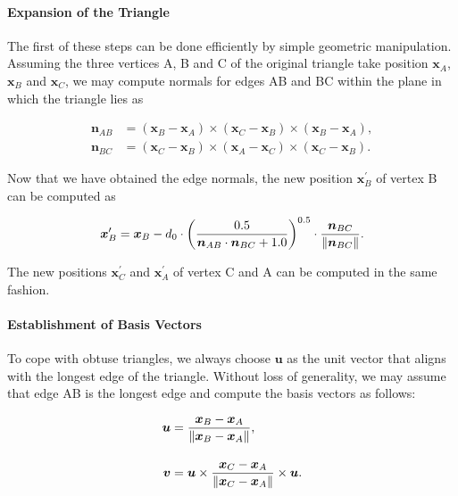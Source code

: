 \documentclass[
	11pt, 
	DIV10,
	ngerman,
	a4paper, 
	oneside, 
	headings=normal, 
	captions=tableheading,
	final, 
	numbers=noenddot
]{scrartcl}
\DeclarePairedDelimiter{\norm}{\lVert}{\rVert}
\begin{document}
\paragraph{Expansion of the Triangle} The first of these steps can be done efficiently by simple geometric manipulation. Assuming the three vertices A, B and C of the original triangle take position $ \boldsymbol{x}_{A} $, $ \boldsymbol{x}_{B} $ and $ \boldsymbol{x}_{C} $, we may compute normals for edges AB and BC within the plane in which the triangle lies as

\begin{equation}
\begin{split}
	\label{eq5}
	\boldsymbol{n}_{AB} &= \left(\boldsymbol{x}_{B} - \boldsymbol{x}_{A}\right) \times \left(\boldsymbol{x}_{C} - \boldsymbol{x}_{B}\right) \times \left(\boldsymbol{x}_{B} - \boldsymbol{x}_{A}\right), \\[1em]
	\boldsymbol{n}_{BC} &= \left(\boldsymbol{x}_{C} - \boldsymbol{x}_{B}\right) \times \left(\boldsymbol{x}_{A} - \boldsymbol{x}_{C}\right) \times \left(\boldsymbol{x}_{C} - \boldsymbol{x}_{B}\right).
\end{split}
\end{equation}

Now that we have obtained the edge normals, the new position $ \boldsymbol{x}_{B}^{\prime} $ of vertex B can be computed as

\begin{equation}
	\label{eq6}
	\boldsymbol{x}_{B}^{\prime} = \boldsymbol{x}_{B} - d_{0} \cdot \left(\frac{0.5}{\boldsymbol{n}_{AB} \cdot \boldsymbol{n}_{BC} + 1.0}\right)^{0.5} \cdot \frac{\boldsymbol{n}_{BC}}{\norm{\boldsymbol{n}_{BC}}}.
\end{equation}

The new positions $ \boldsymbol{x}_{C}^{\prime} $ and $ \boldsymbol{x}_{A}^{\prime} $ of vertex C and A can be computed in the same fashion.

\paragraph{Establishment of Basis Vectors} To cope with obtuse triangles, we always choose $ \boldsymbol{u} $ as the unit vector that aligns with the longest edge of the triangle. Without loss of generality, we may assume that edge AB is the longest edge and compute the basis vectors as follows:

\begin{equation}
\begin{split}
	\label{eq7}
	\boldsymbol{u} &= \frac{\boldsymbol{x}_{B} - \boldsymbol{x}_{A}}{\norm{\boldsymbol{x}_{B} - \boldsymbol{x}_{A}}}, \\[1em]
	\boldsymbol{v} &= \boldsymbol{u} \times \frac{\boldsymbol{x}_{C} - \boldsymbol{x}_{A}}{\norm{\boldsymbol{x}_{C} - \boldsymbol{x}_{A}}} \times \boldsymbol{u}.
\end{split}
\end{equation}
\end{document}
